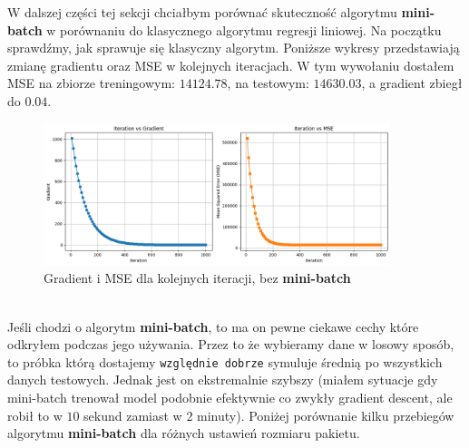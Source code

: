 \documentclass[polish,12pt,a4paper]{extarticle}
\begin{document}
W dalszej części tej sekcji chciałbym porównać skuteczność algorytmu \textbf{mini-batch} w porównaniu do klasycznego algorytmu regresji liniowej. Na początku sprawdźmy, jak sprawuje się klasyczny algorytm. Poniższe wykresy przedstawiają zmianę gradientu oraz MSE w kolejnych iteracjach. W tym wywołaniu dostałem MSE na zbiorze treningowym: $14124.78$, na testowym: $14630.03$, a gradient zbiegł do $0.04$.
\begin{figure}
    \centering
    \includegraphics[width=0.9\textwidth]{itgradnormal.png}
    \caption{Gradient i MSE dla kolejnych iteracji, bez \textbf{mini-batch}}
\end{figure} \\
Jeśli chodzi o algorytm \textbf{mini-batch}, to ma on pewne ciekawe cechy które odkryłem podczas jego używania. Przez to że wybieramy dane w losowy sposób, to próbka którą dostajemy \texttt{względnie dobrze} symuluje średnią po wszystkich danych testowych. Jednak jest on ekstremalnie szybszy (miałem sytuacje gdy mini-batch trenował model podobnie efektywnie co zwykły gradient descent, ale robił to w $10$ sekund zamiast w $2$ minuty). Poniżej porównanie kilku przebiegów algorytmu \textbf{mini-batch} dla różnych ustawień rozmiaru pakietu.
\end{document}
